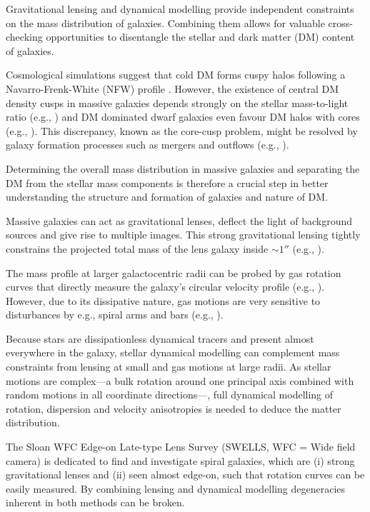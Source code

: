 \documentclass[useAMS,usenatbib]{mnras}
\begin{document}
Gravitational lensing and dynamical modelling provide independent constraints on the mass distribution of galaxies. Combining them allows for valuable cross-checking opportunities to disentangle the stellar and dark matter (DM) content of galaxies.

Cosmological simulations suggest that cold DM forms cuspy halos following a Navarro-Frenk-White (NFW) profile \citep{1996ApJ...462..563N}. However, the existence of central DM density cusps in massive galaxies depends strongly on the stellar mass-to-light ratio (e.g., \citealt{2011MNRAS.416..322D}) and DM dominated dwarf galaxies even favour DM halos with cores (e.g., \citealt{1994Natur.370..629M,2001ApJ...552L..23D}). This discrepancy, known as the core-cusp problem, might be resolved by galaxy formation processes such as mergers and outflows (e.g., \citealt{2001ApJ...560..636E,2012MNRAS.421.3464P}).

Determining the overall mass distribution in massive galaxies and separating the DM from the stellar mass components is therefore a crucial step in better understanding the structure and formation of galaxies and nature of DM.

Massive galaxies can act as gravitational lenses, deflect the light of background sources and give rise to multiple images. This strong gravitational lensing tightly constrains the projected total mass of the lens galaxy inside $\sim 1''$ (e.g., \citealt{2010ARA&A..48...87T}). 

The mass profile at larger galactocentric radii can be probed by gas rotation curves that directly measure the galaxy's circular velocity profile (e.g., \citealt{1980ApJ...238..471R}). However, due to its dissipative nature, gas motions are very sensitive to disturbances by e.g., spiral arms and bars (e.g., \citealt{2004dad..book.....S}). 

Because stars are dissipationless dynamical tracers and present almost everywhere in the galaxy, stellar dynamical modelling can complement mass constraints from lensing at small and gas motions at large radii. As stellar motions are complex---a bulk rotation around one principal axis combined with random motions in all coordinate directions---, full dynamical modelling of rotation, dispersion and velocity anisotropies is needed to deduce the matter distribution.

The Sloan WFC Edge-on Late-type Lens Survey (SWELLS, WFC = Wide field camera) \citep{SWELLSI,SWELLSII,SWELLSIII,SWELLSIV,SWELLSV,SWELLSVI} is dedicated to find and investigate spiral galaxies, which are (i) strong gravitational lenses and (ii) seen almost edge-on, such that rotation curves can be easily measured. By combining lensing and dynamical modelling degeneracies inherent in both methods can be broken.
\end{document}

